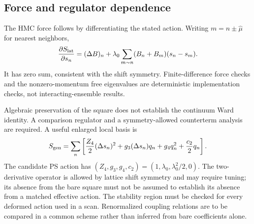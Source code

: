 \subsection{Force and regulator dependence}

The HMC force follows by differentiating the stated action.  Writing $m=n\pm\hat\mu$ for nearest neighbors,
\begin{equation}
 \frac{\partial S_{\rm lat}}{\partial s_n}
 =(\Delta B)_n+\lambda_0\sum_{m\sim n}(B_n+B_m)(s_n-s_m).
 \label{eq:lattice-force}
\end{equation}
It has zero sum, consistent with the shift symmetry.  Finite-difference force checks and the nonzero-momentum free eigenvalues are deterministic implementation checks, not interacting-ensemble results.

Algebraic preservation of the square does not establish the continuum Ward identity.  A comparison regulator and a symmetry-allowed counterterm analysis are required.  A useful enlarged local basis is
\begin{equation}
 S_{\rm gen}=\sum_n\left[\frac{Z_4}{2}(\Delta s_n)^2
 +g_3(\Delta s_n)q_n+g_4 q_n^2+\frac{c_2}{2}q_n\right].
\end{equation}
The candidate PS action has $(Z_4,g_3,g_4,c_2)=(1,\lambda_0,\lambda_0^2/2,0)$.  The two-derivative operator is allowed by lattice shift symmetry and may require tuning; its absence from the bare square must not be assumed to establish its absence from a matched effective action.  The stability region must be checked for every deformed action used in a scan.  Renormalized coupling relations are to be compared in a common scheme rather than inferred from bare coefficients alone.
